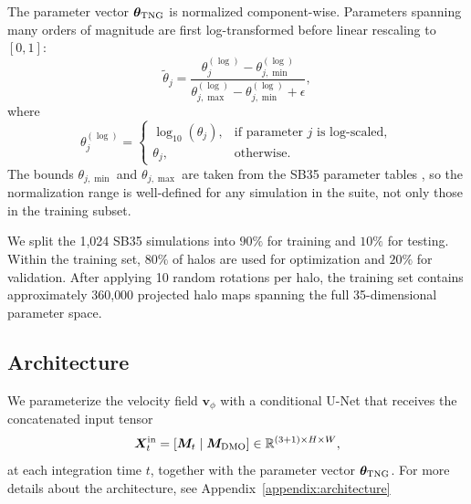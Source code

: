 \documentclass[linenumbers,trackchanges, twocolumn]{aastex701}
\begin{document}
The parameter vector $\boldsymbol{\theta}_{\rm TNG}$ is normalized component-wise. Parameters spanning many orders of magnitude are first log-transformed before linear rescaling to $[0,1]$:
\begin{equation}
    \tilde{\theta}_j
    =
    \frac{\theta_j^{(\log)} - \theta_{j,\min}^{(\log)}}
         {\theta_{j,\max}^{(\log)} - \theta_{j,\min}^{(\log)} + \epsilon},
    \label{eq:paramnorm}
\end{equation}
where
\begin{equation}
    \theta_j^{(\log)}
    =
    \begin{cases}
        \log_{10}(\theta_j), & \text{if parameter } j \text{ is log-scaled},\\
        \theta_j,            & \text{otherwise.}
    \end{cases}
\end{equation}
The bounds $\theta_{j,\min}$ and $\theta_{j,\max}$ are taken from the SB35 parameter tables \citep{Genel-2026}, so the normalization range is well-defined for any simulation in the suite, not only those in the training subset.

We split the 1{,}024 SB35 simulations into $90\%$ for training and $10\%$ for testing. Within the training set, $80\%$ of halos are used for optimization and $20\%$ for validation. After applying 10 random rotations per halo, the training set contains approximately 360{,}000 projected halo maps spanning the full 35-dimensional parameter space.

\subsection{Architecture}
\label{subsec:architecture}

We parameterize the velocity field $\bm{v}_\phi$ with a conditional U-Net \citep{ronneberger2015unet} that receives the concatenated input tensor
\begin{equation}
    \bm{X}^{\rm in}_t
    = \left[\bm{M}_t \;\middle|\; \bm{M}_{\rm DMO}\right]
    \in \mathbb{R}^{(3+1) \times H \times W},
    \label{eq:model_input}
\end{equation}
at each integration time $t$, together with the parameter vector $\boldsymbol{\theta}_{\rm TNG}$. For more details about the architecture, see Appendix~\ref{appendix:architecture}


\end{document}
